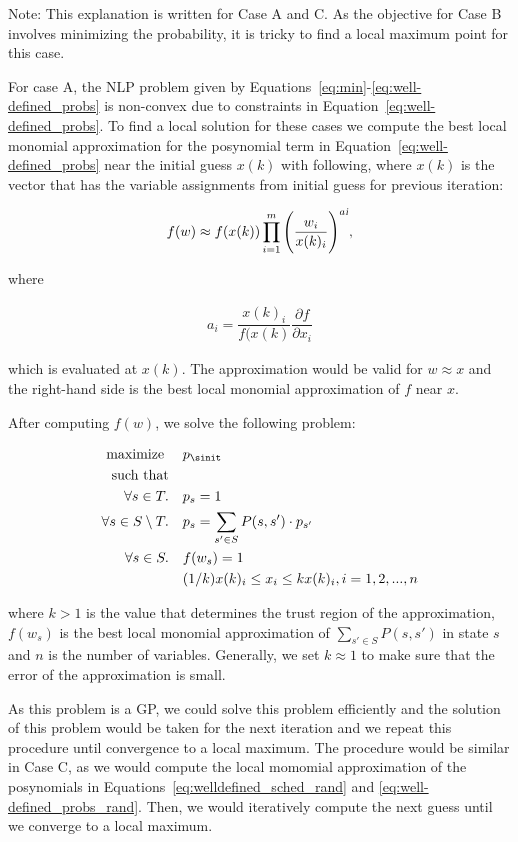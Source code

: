 Note: This explanation is written for Case A and C. As the objective for Case B involves minimizing the probability, it is tricky to find a local maximum point for this case.


For case A, the NLP problem given by Equations~\ref{eq:min}-\ref{eq:well-defined_probs} is non-convex due to constraints in Equation~\ref{eq:well-defined_probs}. To find a local solution for these cases we compute the best local monomial approximation for the posynomial term in Equation~\ref{eq:well-defined_probs} near the initial guess $x(k)$ with following, where $x(k)$ is the vector that has the variable assignments from initial guess for previous iteration:

\begin{align*}
f(w)\approx f(x(k))\prod_{i=1}^{m}\Bigg(\dfrac{w_{i}}{x(k)_{i}}\Bigg)^{a\textsl{i}},
\end{align*}

\noindent where

\begin{align*}
a_{i}=\dfrac{x(k)_{i}}{f(x(k)}\dfrac{\partial f}{\partial x_{i}}
\end{align*}

which is evaluated at $x(k)$. The approximation would be valid for $w \approx x$ and the right-hand side is the best local monomial approximation of $f$ near $x$.

After computing $f(w)$, we solve the following problem:


		\begin{align}
			\text{maximize } &\quad p_{\sinit}\\
			\text{such that}\\
			\forall s\in T.	 &\quad p_s=1\\
			\forall s\in S\setminus T.	&\quad p_s = \sum_{s'\in S}	P(s,s')\cdot p_{s'}\\
			\forall s\in S.	 &\quad f(w_{s})=1\\
			&\quad (1/k)x(k)_{i}\leq x_{i} \leq kx(k)_{i}, i=1,2,...,n
		\end{align}
		
\noindent where $k > 1$ is the value that determines the trust region of the approximation, $f(w_{s})$ is the best local monomial approximation of $\sum_{s'\in S}P(s,s')$ in state $s$ and $n$ is the number of variables. Generally, we set $k \approx 1$ to make sure that the error of the approximation is small.

As this problem is a GP, we could solve this problem efficiently and the solution of this problem would be taken for the next iteration and we repeat this procedure until convergence to a local maximum. The procedure would be similar in Case C, as we would compute the local momomial approximation of the posynomials in Equations~\ref{eq:welldefined_sched_rand} and \ref{eq:well-defined_probs_rand}. Then, we would iteratively compute the next guess until we converge to a local maximum.
